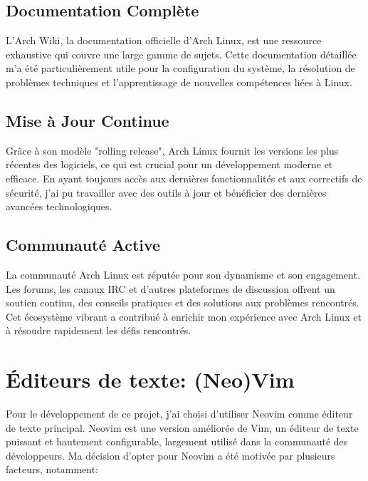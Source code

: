 \subsection{Documentation Complète}

\hspace{16pt}L'Arch Wiki, la documentation officielle d'Arch Linux, est une ressource exhaustive qui couvre une large gamme de sujets. Cette documentation détaillée m'a été particulièrement utile pour la configuration du système, la résolution de problèmes techniques et l'apprentissage de nouvelles compétences liées à Linux.

\subsection{Mise à Jour Continue}

\hspace{16pt}Grâce à son modèle "rolling release", Arch Linux fournit les versions les plus récentes des logiciels, ce qui est crucial pour un développement moderne et efficace. En ayant toujours accès aux dernières fonctionnalités et aux correctifs de sécurité, j'ai pu travailler avec des outils à jour et bénéficier des dernières avancées technologiques.

\subsection{Communauté Active}

\hspace{16pt}La communauté Arch Linux est réputée pour son dynamisme et son engagement. Les forums, les canaux IRC et d'autres plateformes de discussion offrent un soutien continu, des conseils pratiques et des solutions aux problèmes rencontrés. Cet écosystème vibrant a contribué à enrichir mon expérience avec Arch Linux et à résoudre rapidement les défis rencontrés.


\section{Éditeurs de texte: (Neo)Vim}

\hspace{16pt}Pour le développement de ce projet, j'ai choisi d'utiliser Neovim comme éditeur de texte principal. Neovim est une version améliorée de Vim, un éditeur de texte puissant et hautement configurable, largement utilisé dans la communauté des développeurs. Ma décision d'opter pour Neovim a été motivée par plusieurs facteurs, notamment:

